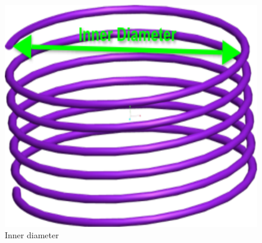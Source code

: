 \documentclass[11pt]{article}
\begin{document}
		\begin{figure}[h]
		  \begin{center}\includegraphics[scale=.2]{Spring_Description2.png}\end{center}
		  \label{Description2}
		  \caption{Inner diameter}
		\end{figure}
		
\end{document}
